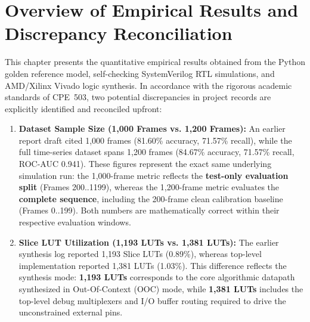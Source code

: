 \documentclass[11pt,a4paper]{report}
\begin{document}
\section{Overview of Empirical Results and Discrepancy Reconciliation}
This chapter presents the quantitative empirical results obtained from the Python golden
reference model, self-checking SystemVerilog RTL simulations, and AMD/Xilinx Vivado logic
synthesis. In accordance with the rigorous academic standards of CPE~503, two potential
discrepancies in project records are explicitly identified and reconciled upfront:
\begin{enumerate}
    \item \textbf{Dataset Sample Size (1,000 Frames vs. 1,200 Frames):} An earlier report
    draft cited 1,000 frames (81.60\% accuracy, 71.57\% recall), while the full time-series
    dataset spans 1,200 frames (84.67\% accuracy, 71.57\% recall, ROC-AUC 0.941). These figures
    represent the exact same underlying simulation run: the 1,000-frame metric reflects the
    \textbf{test-only evaluation split} (Frames 200..1199), whereas the 1,200-frame metric
    evaluates the \textbf{complete sequence}, including the 200-frame clean calibration baseline
    (Frames 0..199). Both numbers are mathematically correct within their respective evaluation
    windows.
    \item \textbf{Slice LUT Utilization (1,193 LUTs vs. 1,381 LUTs):} The earlier synthesis log
    reported 1,193 Slice LUTs (0.89\%), whereas top-level implementation reported 1,381 LUTs
    (1.03\%). This difference reflects the synthesis mode: \textbf{1,193 LUTs} corresponds to
    the core algorithmic datapath synthesized in Out-Of-Context (OOC) mode, while \textbf{1,381 LUTs}
    includes the top-level debug multiplexers and I/O buffer routing required to drive the
    unconstrained external pins.
\end{enumerate}
\end{document}
